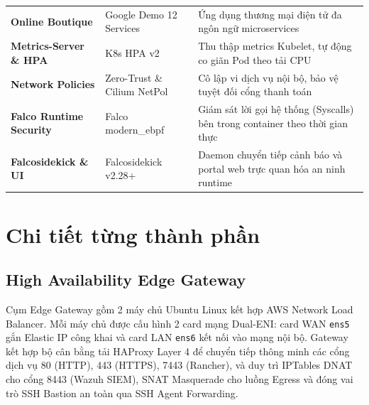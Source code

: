 \begin{table}[H]
\begin{tabularx}{\textwidth}{l l X}
        \textbf{Online Boutique} & Google Demo 12 Services & Ứng dụng thương mại điện tử đa ngôn ngữ microservices \\
        \textbf{Metrics-Server \& HPA} & K8s HPA v2 & Thu thập metrics Kubelet, tự động co giãn Pod theo tải CPU \\
        \textbf{Network Policies} & Zero-Trust \& Cilium NetPol & Cô lập vi dịch vụ nội bộ, bảo vệ tuyệt đối cổng thanh toán \\
        \textbf{Falco Runtime Security} & Falco modern\_ebpf & Giám sát lời gọi hệ thống (Syscalls) bên trong container theo thời gian thực \\
        \textbf{Falcosidekick \& UI} & Falcosidekick v2.28+ & Daemon chuyển tiếp cảnh báo và portal web trực quan hóa an ninh runtime \\
        \bottomrule
    \end{tabularx}
\end{table}

\section{Chi tiết từng thành phần}

\subsection{High Availability Edge Gateway}
Cụm Edge Gateway gồm 2 máy chủ Ubuntu Linux kết hợp AWS Network Load Balancer. Mỗi máy chủ được cấu hình 2 card mạng Dual-ENI: card WAN \texttt{ens5} gắn Elastic IP công khai và card LAN \texttt{ens6} kết nối vào mạng nội bộ. Gateway kết hợp bộ cân bằng tải HAProxy Layer 4 để chuyển tiếp thông minh các cổng dịch vụ 80 (HTTP), 443 (HTTPS), 7443 (Rancher), và duy trì IPTables DNAT cho cổng 8443 (Wazuh SIEM), SNAT Masquerade cho luồng Egress và đóng vai trò SSH Bastion an toàn qua SSH Agent Forwarding.

